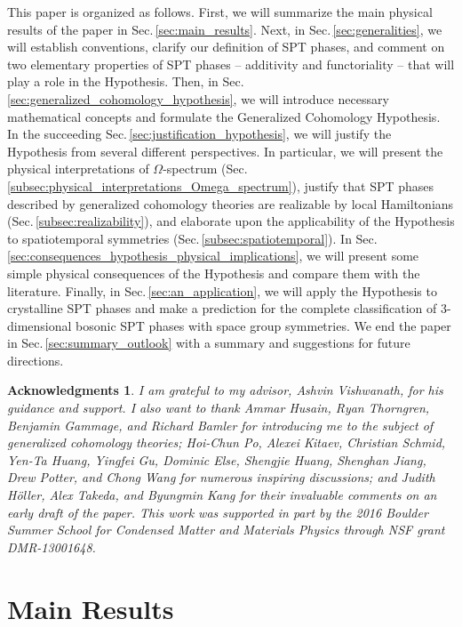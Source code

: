 \documentclass[sort&compress]{elsarticle}
\theoremstyle{theoremstyle}
\theoremstyle{framedtheoremstyle}
\theoremstyle{definitionstyle}
\theoremstyle{definitionstyle}
\theoremstyle{definitionstyle}
\theoremstyle{definitionstyle}
\theoremstyle{nameddefinitionstyle}
\theoremstyle{framednameddefinitionstyle}
\theoremstyle{proofstyle}
\theoremstyle{definitionstyle}
\newtheorem*{ack}{Acknowledgments}
\begin{document}
This paper is organized as follows. First, we will summarize the main physical results of the paper in Sec.\,\ref{sec:main_results}. Next, in Sec.\,\ref{sec:generalities}, we will establish conventions, clarify our definition of SPT phases, and comment on two elementary properties of SPT phases -- additivity and functoriality -- that will play a role in the Hypothesis. Then, in Sec.\,\ref{sec:generalized_cohomology_hypothesis}, we will introduce necessary mathematical concepts and formulate the Generalized Cohomology Hypothesis. In the succeeding Sec.\,\ref{sec:justification_hypothesis}, we will justify the Hypothesis from several different perspectives. In particular, we will present the physical interpretations of $\Omega$-spectrum (Sec.\,\ref{subsec:physical_interpretations_Omega_spectrum}), justify that SPT phases described by generalized cohomology theories are realizable by local Hamiltonians (Sec.\,\ref{subsec:realizability}), and elaborate upon the applicability of the Hypothesis to spatiotemporal symmetries (Sec.\,\ref{subsec:spatiotemporal}). In Sec.\,\ref{sec:consequences_hypothesis_physical_implications}, we will present some simple physical consequences of the Hypothesis and compare them with the literature. Finally, in Sec.\,\ref{sec:an_application}, we will apply the Hypothesis to crystalline SPT phases and make a prediction for the complete classification of 3-dimensional bosonic SPT phases with space group symmetries. We end the paper in Sec.\,\ref{sec:summary_outlook} with a summary and suggestions for future directions.

\begin{ack}
I am grateful to my advisor, Ashvin Vishwanath, for his guidance and support.
I also want to thank Ammar Husain, Ryan Thorngren, Benjamin Gammage, and Richard Bamler for introducing me to the subject of generalized cohomology theories;
Hoi-Chun Po, Alexei Kitaev, Christian Schmid, Yen-Ta Huang, Yingfei Gu, Dominic Else, Shengjie Huang, Shenghan Jiang, Drew Potter, and Chong Wang for numerous inspiring discussions;
and Judith H\"oller, Alex Takeda, and Byungmin Kang for their invaluable comments on an early draft of the paper.
This work was supported in part by the 2016 Boulder Summer School for Condensed Matter and Materials Physics through NSF grant DMR-13001648.
\end{ack}






\section{Main Results\label{sec:main_results}}
\end{document}
